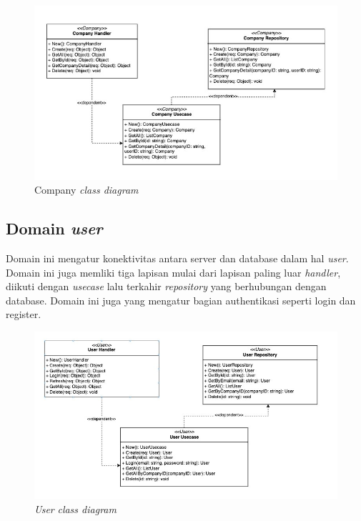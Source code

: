 \begin{figure}[h]
  \centering
  \includegraphics[width=1\textwidth]{resources/chapter-3/class/company-class-diagram.jpg}
  \caption{Company \textit{class diagram}}
  \label{fig:company-class-diagram}
\end{figure}

\pagebreak

\subsection{Domain \textit{user}}

Domain ini mengatur konektivitas antara server dan database dalam hal \textit{user}. Domain ini juga memliki tiga lapisan mulai dari lapisan paling luar \textit{handler}, diikuti dengan \textit{usecase} lalu terkahir \textit{repository} yang berhubungan dengan database. Domain ini juga yang mengatur bagian authentikasi seperti login dan register.

\begin{figure}[h]
  \centering
  \includegraphics[width=1\textwidth]{resources/chapter-3/class/user-class-diagram.jpg}
  \caption{\textit{User} \textit{class diagram}}
  \label{fig:user-class-diagram}
\end{figure}

